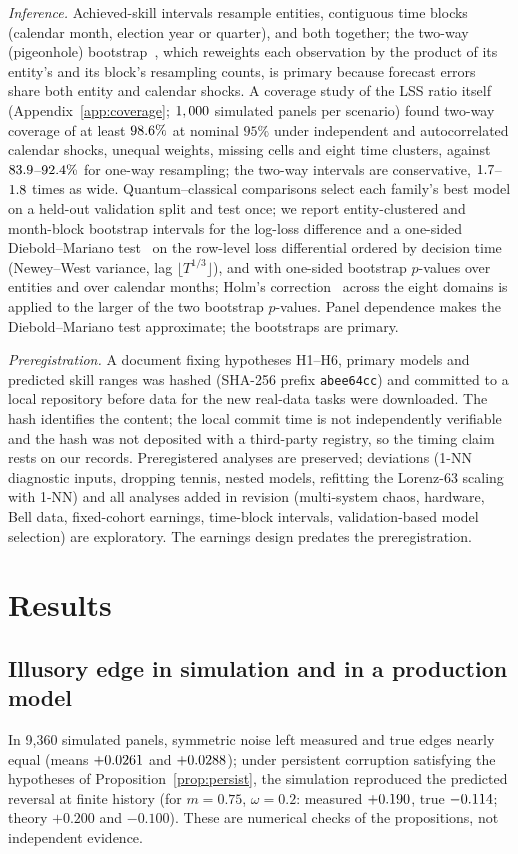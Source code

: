 \documentclass[journal]{IEEEtran}
\theoremstyle{definition}
\begin{document}
\emph{Inference.} Achieved-skill intervals resample entities, contiguous time blocks (calendar month, election year or quarter), and both together; the two-way (pigeonhole) bootstrap~\cite{owen2007pigeonhole}, which reweights each observation by the product of its entity's and its block's resampling counts, is primary because forecast errors share both entity and calendar shocks. A coverage study of the LSS ratio itself (Appendix~\ref{app:coverage}; $1,000$ simulated panels per scenario) found two-way coverage of at least $98.6\%$ at nominal $95\%$ under independent and autocorrelated calendar shocks, unequal weights, missing cells and eight time clusters, against $83.9$--$92.4\%$ for one-way resampling; the two-way intervals are conservative, $1.7$--$1.8$ times as wide. Quantum--classical comparisons select each family's best model on a held-out validation split and test once; we report entity-clustered and month-block bootstrap intervals for the log-loss difference and a one-sided Diebold--Mariano test~\cite{diebold1995comparing} on the row-level loss differential ordered by decision time (Newey--West variance, lag $\lfloor T^{1/3}\rfloor$), and with one-sided bootstrap $p$-values over entities and over calendar months; Holm's correction~\cite{holm1979simple} across the eight domains is applied to the larger of the two bootstrap $p$-values. Panel dependence makes the Diebold--Mariano test approximate; the bootstraps are primary.

\emph{Preregistration.} A document fixing hypotheses H1--H6, primary models and predicted skill ranges was hashed (SHA-256 prefix \texttt{abee64cc}) and committed to a local repository before data for the new real-data tasks were downloaded. The hash identifies the content; the local commit time is not independently verifiable and the hash was not deposited with a third-party registry, so the timing claim rests on our records. Preregistered analyses are preserved; deviations (1-NN diagnostic inputs, dropping tennis, nested models, refitting the Lorenz-63 scaling with 1-NN) and all analyses added in revision (multi-system chaos, hardware, Bell data, fixed-cohort earnings, time-block intervals, validation-based model selection) are exploratory. The earnings design predates the preregistration.

\section{Results}\label{sec:results}
\subsection{Illusory edge in simulation and in a production model}
In 9{,}360 simulated panels, symmetric noise left measured and true edges nearly equal (means $+0.0261$ and $+0.0288$); under persistent corruption satisfying the hypotheses of Proposition~\ref{prop:persist}, the simulation reproduced the predicted reversal at finite history (for $m=0.75$, $\omega=0.2$: measured $+0.190$, true $-0.114$; theory $+0.200$ and $-0.100$). These are numerical checks of the propositions, not independent evidence.
\end{document}
